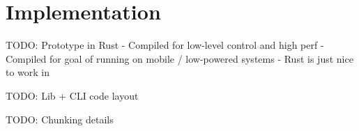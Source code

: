 \chapter{Implementation}

TODO: Prototype in Rust
    - Compiled for low-level control and high perf
    - Compiled for goal of running on mobile / low-powered systems
    - Rust is just nice to work in

TODO: Lib + CLI code layout

TODO: Chunking details
